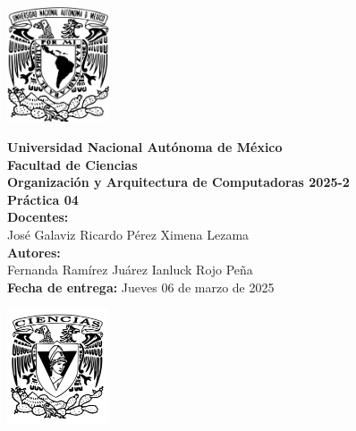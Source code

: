 \documentclass[12pt,letterpaper]{article}
\begin{document}
\begin{center}
\newcommand{\imp}{\rightarrow}
\newcommand{\vp}{\varphi}
  \begin{minipage}{3cm}
    \begin{center}
      \includegraphics[height=3.4cm]{../unam_logo.png}
    \end{center}
  \end{minipage}\hfill
  \begin{minipage}{10cm}
    \begin{center}
      \textbf{\Large Universidad Nacional Autónoma de México}\\[0.2cm]
      \textbf{\large Facultad de Ciencias}\\[0.2cm]
      \textbf{Organización y Arquitectura de Computadoras 2025-2}\\[0.4cm]
      \textbf{\Large Práctica 04}\\[0.1cm]
      \textbf{Docentes:}\\
      José Galaviz \hspace{1em} Ricardo Pérez \hspace{1em} Ximena Lezama\\[0.3cm]
      \textbf{Autores:}\\
      Fernanda Ramírez Juárez \quad Ianluck Rojo Peña\\[0.3cm]
      \textbf{Fecha de entrega:} Jueves 06 de marzo de 2025
    \end{center}
  \end{minipage}\hfill
  \begin{minipage}{3cm}
    \begin{center}
      \includegraphics[height=3.4cm]{../fc_logo.png}
    \end{center}
  \end{minipage}
\end{center}
\end{document}
